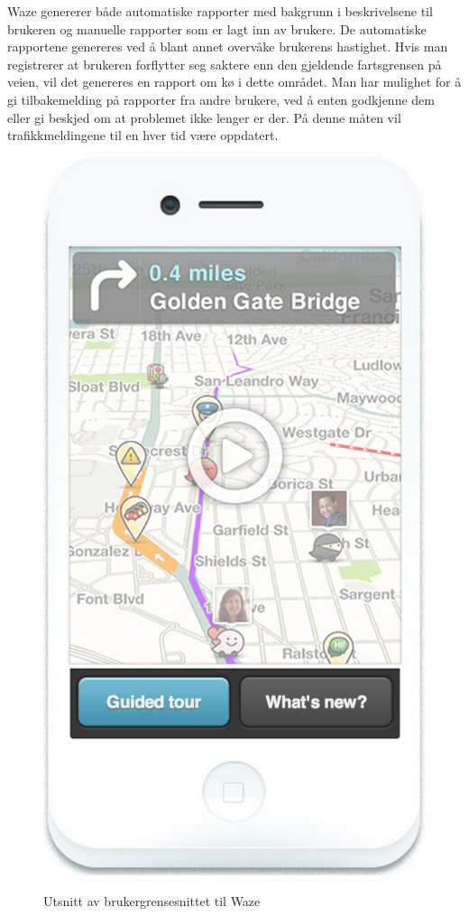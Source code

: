 \documentclass[a4paper,norsk,oneside]{book}
\begin{document}
Waze genererer både automatiske rapporter med bakgrunn i beskrivelsene til brukeren og manuelle rapporter som er lagt inn av brukere. De automatiske rapportene genereres ved å blant annet overvåke brukerens hastighet. Hvis man registrerer at brukeren forflytter seg saktere enn den gjeldende fartsgrensen på veien, vil det genereres en rapport om kø i dette området. Man har mulighet for å gi tilbakemelding på rapporter fra andre brukere, ved å enten godkjenne dem eller gi beskjed om at problemet ikke lenger er der. På denne måten vil trafikkmeldingene til en hver tid være oppdatert.

\begin{figure}[H]
\centering
\includegraphics[scale=0.5]{figs/waze2.png}
\label{waze1}
\caption{Utsnitt av brukergrensesnittet til Waze}
\end{figure}
\end{document}
